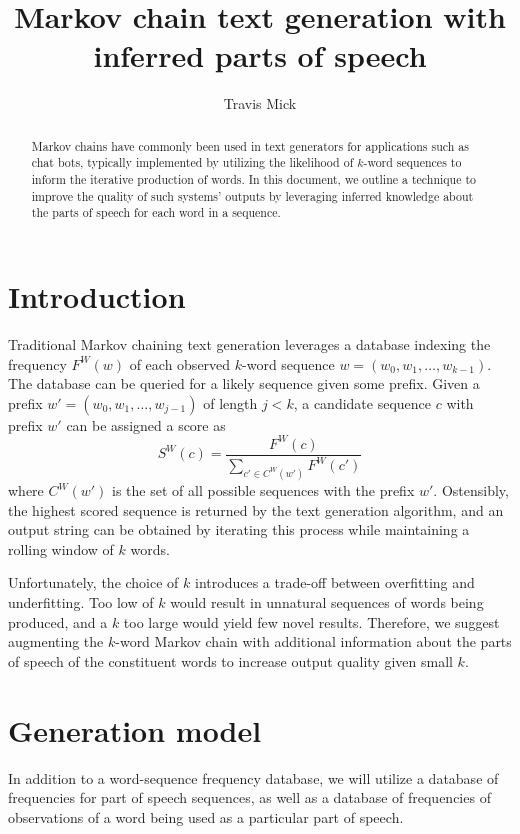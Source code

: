 \documentclass[11pt]{article}
\title{\textbf{Markov chain text generation with inferred parts of speech}}
\author{Travis Mick}
\begin{document}
\maketitle

\begin{abstract}
Markov chains have commonly been used in text generators for applications
such as chat bots, typically implemented by utilizing the likelihood of $k$-word
sequences to inform the iterative production of words.
%
In this document, we outline a technique to improve the quality of such systems'
outputs by leveraging inferred knowledge about the parts of speech for each
word in a sequence.
%
\end{abstract}

\section{Introduction}

Traditional Markov chaining text generation leverages a database indexing the
frequency $F^W(w)$ of each observed $k$-word sequence $w = (w_0, w_1, \dots, w_{k-1})$.
%
The database can be queried for a likely sequence given some prefix.
%
Given a prefix $w' = (w_0, w_1, \dots, w_{j-1})$ of length $j < k$, a candidate
sequence $c$ with prefix $w'$ can be assigned a score as
%
\begin{equation}
\label{eqn:wordscore}
S^W(c) = \frac{F^W(c)}{\sum_{c' \in C^W(w')} F^W(c')}
\end{equation}
where $C^W(w')$ is the set of all possible sequences with the prefix $w'$.
%
Ostensibly, the highest scored sequence is returned by the text generation algorithm,
and an output string can be obtained by iterating this process while maintaining a
rolling window of $k$ words.
%

Unfortunately, the choice of $k$ introduces a trade-off between overfitting and underfitting.
%
Too low of $k$ would result in unnatural sequences of words being produced, and a $k$ too large
would yield few novel results.
%
Therefore, we suggest augmenting the $k$-word Markov chain with additional information about
the parts of speech of the constituent words to increase output quality given small $k$.
%

\section{Generation model}

In addition to a word-sequence frequency database, we will utilize a database of frequencies for
part of speech sequences, as well as a database of frequencies of observations of a word being
used as a particular part of speech.
%
\end{document}
